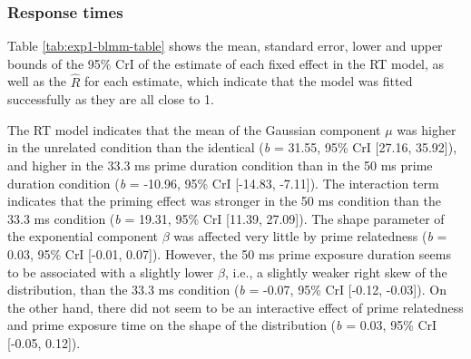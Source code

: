 \documentclass[
  english,
  man,floatsintext]{apa6}
\begin{document}
\newpage

\hypertarget{response-times}{%
\subsubsection{Response times}\label{response-times}}

Table \ref{tab:exp1-blmm-table} shows the mean, standard error, lower and upper bounds of the 95\% CrI of the estimate of each fixed effect in the RT model, as well as the \(\hat{R}\) for each estimate, which indicate that the model was fitted successfully as they are all close to 1.

The RT model indicates that the mean of the Gaussian component \(\mu\) was higher in the unrelated condition than the identical (\emph{b} = 31.55, 95\% CrI {[}27.16, 35.92{]}), and higher in the 33.3 ms prime duration condition than in the 50 ms prime duration condition (\emph{b} = -10.96, 95\% CrI {[}-14.83, -7.11{]}). The interaction term indicates that the priming effect was stronger in the 50 ms condition than the 33.3 ms condition (\emph{b} = 19.31, 95\% CrI {[}11.39, 27.09{]}). The shape parameter of the exponential component \(\beta\) was affected very little by prime relatedness (\emph{b} = 0.03, 95\% CrI {[}-0.01, 0.07{]}). However, the 50 ms prime exposure duration seems to be associated with a slightly lower \(\beta\), i.e., a slightly weaker right skew of the distribution, than the 33.3 ms condition (\emph{b} = -0.07, 95\% CrI {[}-0.12, -0.03{]}). On the other hand, there did not seem to be an interactive effect of prime relatedness and prime exposure time on the shape of the distribution (\emph{b} = 0.03, 95\% CrI {[}-0.05, 0.12{]}).
\end{document}
